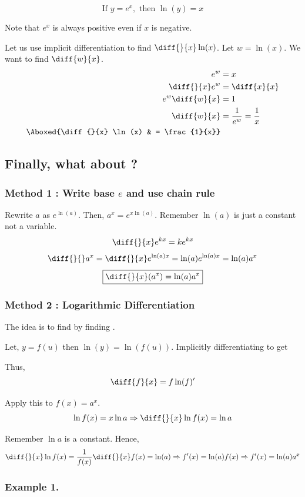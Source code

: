 $$
\boxed{\text{If } y = e^x, \text{ then } \ln(y) = x}
$$

Note that $e^x$ is always positive even if $x$ is negative.

Let us use implicit differentiation to find $\diff{}{x} \ln(x)$. Let $w = \ln(x)$. We want to find $\diff{w}{x}$.
\begin{align*}
	e^w & = x \\
	\diff{}{x} e^w & = \diff{x}{x} \\
	e^w \diff{w}{x} & = 1 \\
	\diff{w}{x} & = \frac{1}{e^w} = \frac{1}{x} \\
	\Aboxed{\diff{}{x} \ln(x) & = \frac{1}{x}}
\end{align*}

\subsection*{Finally, what about ?}

\subsubsection{Method 1 : Write base $e$ and use chain rule}

Rewrite $a$ as $e^{\ln(a)}$.
Then, $ a^x = e^{x \ln(a)} $.
Remember $\ln(a)$ is just a constant not a variable.
$$ \diff{}{x} e^{kx} = ke^{kx} $$
$$ \diff{}{} a^x = \diff{}{x} e^{\ln(a)x} = \ln(a)e^{\ln(a)x} = \ln(a)a^x $$
$$ \boxed{\diff{}{x}(a^x) = \ln(a)a^x}$$


\subsubsection{Method 2 : Logarithmic Differentiation}

The idea is to find  by finding .

Let, $y = f(u)$ then $\ln(y) = \ln(f(u))$.
Implicitly differentiating to get 

Thus, $$\diff{f}{x} = f\ln(f)'$$

Apply this to $f(x) = a^x$.
$$ \ln f(x) = x \ln a \Rightarrow \diff{}{x} \ln f(x) = \ln a $$

Remember $\ln a$ is a constant. Hence,
$$ \diff{}{x} \ln f(x) = \frac{1}{f(x)} \diff{}{x} f(x) = \ln (a) \Rightarrow f'(x) = \ln(a)f(x) \Rightarrow f'(x) = \ln(a)a^x $$


\subsubsection{Example 1. }

